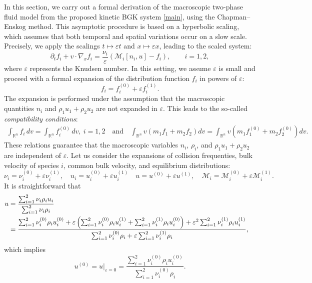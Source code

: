 \documentclass[10pt,reqno]{amsart}
\numberwithin{equation}{section}
\newcommand{\ve}{\varepsilon}
\begin{document}
In this section, we carry out a formal derivation of the macroscopic two-phase fluid model from the proposed kinetic BGK system \eqref{main}, using the Chapman--Enskog method. This asymptotic procedure is based on a hyperbolic scaling, which assumes that both temporal and spatial variations occur on a slow scale. Precisely, we apply the scalings $t \mapsto \varepsilon t$ and $x \mapsto \varepsilon x$, leading to the scaled system:
\begin{equation}\label{CE main}
\partial_t f_i + v\cdot \nabla_x f_i = \frac{\nu_i}{\varepsilon} \left( \mathcal{M}_i[n_i, u] - f_i \right), \qquad i=1,2,
\end{equation}
where $\varepsilon$ represents the Knudsen number.  In this setting, we assume $\varepsilon$ is small and proceed with a formal expansion of the distribution function $f_i$ in powers of $\varepsilon$:
\begin{equation}\label{decomp}
f_i = f_i^{(0)} + \varepsilon f_i^{(1)}.
\end{equation}
The expansion is performed under the assumption that the macroscopic quantities $n_i$ and $\rho_1 u_1 + \rho_2 u_2$ are not expanded in $\varepsilon$. This leads to the so-called \emph{compatibility conditions}:
\begin{align}\label{compatibility}
\int_{\mathbb{R}^n} f_i\,dv = \int_{\mathbb{R}^n} f_i^{(0)}\,dv, \ i=1,2 \quad \mbox{and} \quad \int_{\mathbb{R}^n} v \left( m_1 f_1 + m_2 f_2 \right) dv = \int_{\mathbb{R}^n} v \left( m_1 f_1^{(0)} + m_2 f_2^{(0)} \right) dv.
\end{align}
These relations guarantee that the macroscopic variables $n_i$, $\rho_i$, and $\rho_1u_1+\rho_2u_2$ are independent of $\varepsilon$.
Let us consider the expansions of collision frequenties, bulk velocity of species $i$, common bulk velocity, and equilibrium distributions: 	 
	$$
\nu_i=\nu_i^{(0)}+\ve \nu_i^{(1)},\quad u_i=u_i^{(0)}+\ve u_i^{(1)}\quad u=u^{(0)}+\ve u^{(1)},\quad 	\mathcal{M}_i=\mathcal{M}_i^{(0)}+\ve\mathcal{M}_i^{(1)}.
	$$
It is straightforward that
\begin{align*}
u&=\frac{\sum_{i=1}^2\nu_i \rho_iu_i}{\sum_{i=1}^2\nu_i \rho_i}\cr 
&=\frac{\sum_{i=1}^2\nu_i^{(0)} \rho_iu_i^{(0)}+\ve\left( \sum_{i=1}^2\nu_i^{(0)} \rho_iu_i^{(1)}+\sum_{i=1}^2\nu_i^{(1)} \rho_iu_i^{(0)}\right)+\ve^2\sum_{i=1}^2\nu_i^{(1)} \rho_iu_i^{(1)}}{\sum_{i=1}^2\nu_i^{(0)} \rho_i+\ve \sum_{i=1}^2\nu_i^{(1)} \rho_i},
\end{align*}
which implies
\begin{equation*}
u^{(0)}=u|_{\ve=0}=\frac{\sum_{i=1}^2\nu_i^{(0)} \rho_iu_i^{(0)}}{\sum_{i=1}^2\nu_i^{(0)} \rho_i}.
\end{equation*}
\end{document}
